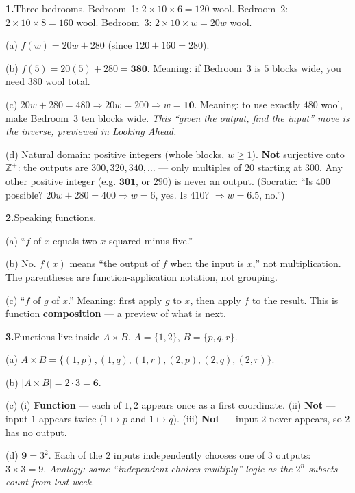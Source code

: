 \documentclass[12pt]{article}
\begin{document}
\textbf{1.}\quad Three bedrooms. Bedroom~1: $2 \times 10 \times 6 = 120$ wool. Bedroom~2:
$2 \times 10 \times 8 = 160$ wool. Bedroom~3: $2 \times 10 \times w = 20w$ wool.

(a)\; $f(w) = 20w + 280$ \;(since $120 + 160 = 280$).

(b)\; $f(5) = 20(5) + 280 = \mathbf{380}$. Meaning: if Bedroom~3 is $5$ blocks wide, you need $380$ wool total.

(c)\; $20w + 280 = 480 \Rightarrow 20w = 200 \Rightarrow w = \mathbf{10}$. Meaning: to use exactly $480$ wool,
make Bedroom~3 ten blocks wide. \textit{This ``given the output, find the input'' move is the inverse, previewed
in Looking Ahead.}

(d)\; Natural domain: positive integers (whole blocks, $w \ge 1$). \textbf{Not} surjective onto $\mathbb{Z}^+$:
the outputs are $300, 320, 340, \ldots$ --- only multiples of $20$ starting at $300$. Any other positive integer
(e.g. $\mathbf{301}$, or $290$) is never an output. (Socratic: ``Is $400$ possible? $20w+280=400 \Rightarrow w=6$,
yes. Is $410$? $\Rightarrow w=6.5$, no.'')

\bigskip
\textbf{2.}\quad Speaking functions.

(a)\; ``$f$ of $x$ equals two $x$ squared minus five.''

(b)\; No. $f(x)$ means ``the output of $f$ when the input is $x$,'' not multiplication. The parentheses are
function-application notation, not grouping.

(c)\; ``$f$ of $g$ of $x$.'' Meaning: first apply $g$ to $x$, then apply $f$ to the result. This is function
\textbf{composition} --- a preview of what is next.

\bigskip
\textbf{3.}\quad Functions live inside $A \times B$. $A=\{1,2\}$, $B=\{p,q,r\}$.

(a)\; $A \times B = \{(1,p),(1,q),(1,r),(2,p),(2,q),(2,r)\}$.

(b)\; $|A \times B| = 2 \cdot 3 = \mathbf{6}$.

(c)\; (i) \textbf{Function} --- each of $1,2$ appears once as a first coordinate.\;
(ii) \textbf{Not} --- input $1$ appears twice ($1\mapsto p$ and $1\mapsto q$).\;
(iii) \textbf{Not} --- input $2$ never appears, so $2$ has no output.

(d)\; $\mathbf{9} = 3^2$. Each of the $2$ inputs independently chooses one of $3$ outputs: $3 \times 3 = 9$.
\textit{Analogy: same ``independent choices multiply'' logic as the $2^n$ subsets count from last week.}
\end{document}
